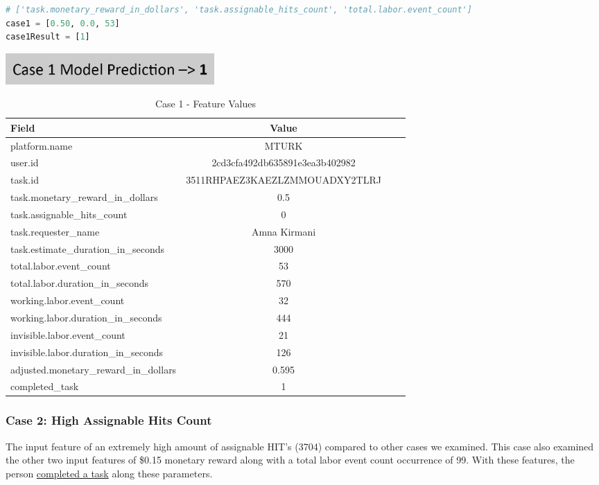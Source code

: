 \documentclass[11pt]{article}
\begin{document}
\begin{lstlisting}[language=Python]
# ['task.monetary_reward_in_dollars', 'task.assignable_hits_count', 'total.labor.event_count']
case1 = [0.50, 0.0, 53]
case1Result = [1]
\end{lstlisting}

\includegraphics[width=0.35\textwidth, center]{figures/case-1-model-prediction}

\begin{table}[hbt!]
   \small
   \centering
   \begin{tabular}{lccr}
   \hline
   \textbf{Field} & \textbf{Value} \\
   \hline
   platform.name & MTURK \\
   user.id & 2cd3cfa492db635891e3ea3b402982 \\
   task.id & 3511RHPAEZ3KAEZLZMMOUADXY2TLRJ \\
   task.monetary\_reward\_in\_dollars & 0.5 \\
   task.assignable\_hits\_count & 0 \\
   task.requester\_name & Amna Kirmani \\
   task.estimate\_duration\_in\_seconds & 3000 \\
   total.labor.event\_count & 53 \\
   total.labor.duration\_in\_seconds & 570 \\
   working.labor.event\_count & 32 \\
   working.labor.duration\_in\_seconds & 444 \\
   invisible.labor.event\_count & 21 \\
   invisible.labor.duration\_in\_seconds & 126 \\
   adjusted.monetary\_reward\_in\_dollars & 0.595 \\
   completed\_task & 1 \\
   \hline
   \end{tabular}
   \caption{Case 1 - Feature Values} 
\end{table}


\subsubsection{Case 2: High Assignable Hits Count}
The input feature of an extremely high amount of assignable HIT’s (3704) compared to other cases we examined. This case also examined the other two input features of \$0.15 monetary reward along with a total labor event count occurrence of 99. With these features, the person \underline{completed a task} along these parameters.
\end{document}
